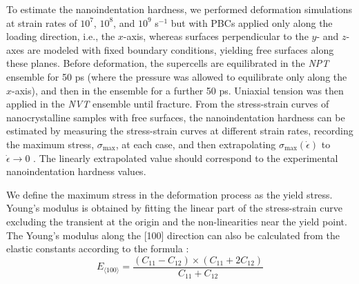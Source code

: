 \documentclass[applsci,article,submit,pdftex,moreauthors]{Definitions/mdpi}
\newcommand{\?}{\stackrel{?}{=}}
\providecommand{\DIFadd}[1]{{\bf #1}} %
\providecommand{\DIFdel}[1]{} %
\providecommand{\DIFaddbegin}{\protect\color{blue}} %
\providecommand{\DIFaddend}{\protect\color{black}} %
\providecommand{\DIFdelbegin}{\protect\color{red}} %
\providecommand{\DIFdelend}{\protect\color{black}} %
\newcommand{\DIFscaledelfig}{0.5}
\newlength{\DIFdelgraphicswidth} %
\newlength{\DIFdelgraphicsheight} %
\newcommand{\DIFaddincludegraphics}[2][]{{\color{blue}\fbox{\DIFOincludegraphics[#1]{#2}}}} %
\newcommand{\DIFdelincludegraphics}[2][]{%
\sbox{\DIFdelgraphicsbox}{\DIFOincludegraphics[#1]{#2}}%
\settoboxwidth{\DIFdelgraphicswidth}{\DIFdelgraphicsbox} %
\settoboxtotalheight{\DIFdelgraphicsheight}{\DIFdelgraphicsbox} %
\scalebox{\DIFscaledelfig}{%
\parbox[b]{\DIFdelgraphicswidth}{\usebox{\DIFdelgraphicsbox}\\[-\baselineskip] \rule{\DIFdelgraphicswidth}{0em}}\llap{\resizebox{\DIFdelgraphicswidth}{\DIFdelgraphicsheight}{%
\setlength{\unitlength}{\DIFdelgraphicswidth}%
\begin{picture}(1,1)%
\thicklines\linethickness{2pt} %
{\color[rgb]{1,0,0}\put(0,0){\framebox(1,1){}}}%
{\color[rgb]{1,0,0}\put(0,0){\line( 1,1){1}}}%
{\color[rgb]{1,0,0}\put(0,1){\line(1,-1){1}}}%
\end{picture}%
}\hspace*{3pt}}} %
} %
\DeclareRobustCommand{\DIFaddbegin}{\DIFOaddbegin \let\includegraphics\DIFaddincludegraphics} %
\DeclareRobustCommand{\DIFaddend}{\DIFOaddend \let\includegraphics\DIFOincludegraphics} %
\DeclareRobustCommand{\DIFdelbegin}{\DIFOdelbegin \let\includegraphics\DIFdelincludegraphics} %
\DeclareRobustCommand{\DIFdelend}{\DIFOaddend \let\includegraphics\DIFOincludegraphics} %
\begin{document}
To estimate the nanoindentation hardness, we performed deformation simulations at strain rates of $10^7$, $10^8$, and $10^9$ s$^{-1}$ but with PBCs applied only along the loading direction, i.e., the $x$-axis, whereas surfaces perpendicular to the $y$- and $z$-axes are modeled with fixed boundary conditions, yielding free surfaces along these planes. Before deformation, the supercells are equilibrated in the \textit{NPT} ensemble for 50 ps (where the pressure was allowed to equilibrate only along the $x$-axis), and then in the \DIFdelbegin \DIFdel{\textit{NVT} }\DIFdelend \DIFaddbegin \DIFadd{canonical (\textit{NVT}) }\DIFaddend ensemble for a further 50 ps. Uniaxial tension was then applied in the \textit{NVT} ensemble until fracture. From the stress-strain curves of nanocrystalline samples with free surfaces, the nanoindentation hardness can be estimated by measuring the stress-strain curves at different strain rates, \DIFaddbegin \DIFadd{$\Dot(\epsilon)$, }\DIFaddend recording the maximum stress, $\sigma_\mathrm{max}$, at each case, and then extrapolating $\sigma_\mathrm{max}(\Dot{\epsilon})$ to $\Dot{\epsilon} \rightarrow 0$ \cite{Ivashchenko2007}. The linearly extrapolated value should correspond to the experimental nanoindentation hardness values.

We define the maximum stress in the deformation process as the yield stress. Young's modulus is obtained by fitting the linear part of the stress-strain curve excluding the transient at the origin and the non-linearities near the yield point. The Young's modulus along the [100] direction can also be calculated from the elastic constants according to the formula \cite{Rosler2007}:
\begin{equation}
E_{\langle 100 \rangle} = \frac{(C_{11}-C_{12}) \times (C_{11}+2 C_{12})}{C_{11}+C_{12}}
\label{Eq:E100}
\end{equation}

\end{document}
